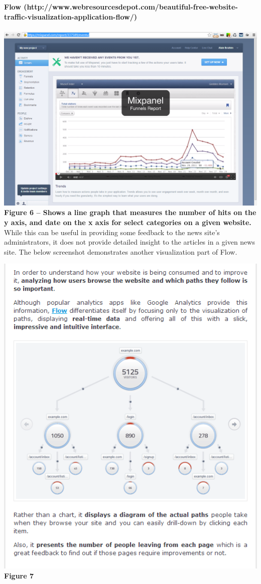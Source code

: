 \documentclass[12pt]{article}
\begin{document}
\noindent\textbf{Flow (http://www.webresourcesdepot.com/beautiful-free-website-traffic-visualization-application-flow/)} \\ \\
\noindent\includegraphics[scale=0.45]{img/flow}
\noindent\textbf{Figure 6 -- Shows a line graph that measures the number of hits on the y axis, and date on the x axis for select categories on a given website.} \\

While this can be useful in providing some feedback to the news site's administrators, it does not provide detailed insight to the articles in a given news site. The below screenshot demonstrates another visualization part of Flow. \\

\vfill

\noindent\includegraphics[scale=0.7]{img/flow1} \\
\noindent\textbf{Figure 7} \\
\end{document}
